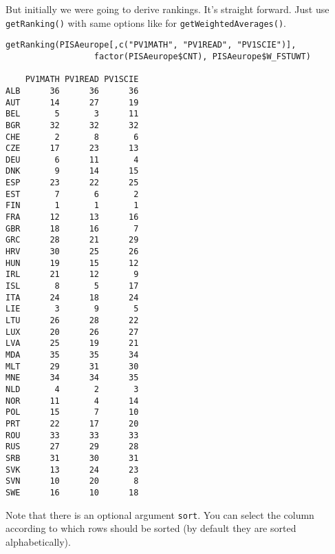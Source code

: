 But initially we were going to derive rankings. It's straight forward. Just use \verb:getRanking(): with same options like for \verb:getWeightedAverages():.

\begin{shaded}\begin{verbatim}
getRanking(PISAeurope[,c("PV1MATH", "PV1READ", "PV1SCIE")], 
                  factor(PISAeurope$CNT), PISAeurope$W_FSTUWT)
                  
    PV1MATH PV1READ PV1SCIE
ALB      36      36      36
AUT      14      27      19
BEL       5       3      11
BGR      32      32      32
CHE       2       8       6
CZE      17      23      13
DEU       6      11       4
DNK       9      14      15
ESP      23      22      25
EST       7       6       2
FIN       1       1       1
FRA      12      13      16
GBR      18      16       7
GRC      28      21      29
HRV      30      25      26
HUN      19      15      12
IRL      21      12       9
ISL       8       5      17
ITA      24      18      24
LIE       3       9       5
LTU      26      28      22
LUX      20      26      27
LVA      25      19      21
MDA      35      35      34
MLT      29      31      30
MNE      34      34      35
NLD       4       2       3
NOR      11       4      14
POL      15       7      10
PRT      22      17      20
ROU      33      33      33
RUS      27      29      28
SRB      31      30      31
SVK      13      24      23
SVN      10      20       8
SWE      16      10      18
\end{verbatim}\end{shaded}

Note that there is an optional argument \verb:sort:. You can select the column according to which rows should be sorted (by default they are sorted alphabetically).

